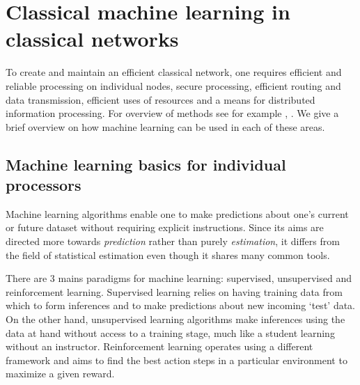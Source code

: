 \documentclass[twocolumn, aps, rmp, amsmath, amssymb, nofootinbib, superscriptaddress, longbibliography, floatfix, table-of-contents, eqsecnum]{revtex4-2}
\begin{document}
\section{Classical machine learning in classical networks}
 To create and maintain an efficient classical network, one requires efficient and reliable processing on individual nodes, secure processing, efficient routing and data transmission, efficient uses of resources and a means for distributed information processing. For overview of methods see for example \cite{boutaba2018comprehensive}, \cite{wang2018machine}.  We give a brief overview on how machine learning can be used in each of these areas. 

\subsection{Machine learning basics for individual processors}
Machine learning algorithms enable one to make predictions about one's current or future dataset without requiring explicit instructions. Since its aims are directed more towards \textit{prediction} rather than purely \textit{estimation}, it differs from the field of statistical estimation even though it shares many common tools.

There are 3 mains paradigms for machine learning: supervised, unsupervised and reinforcement learning. Supervised learning relies on having training data from which to form inferences and to make predictions about new incoming `test' data. On the other hand, unsupervised learning algorithms make inferences using the data at hand without access to a training stage, much like a student learning without an instructor. Reinforcement learning operates using a different framework and aims to find the best action steps in a particular environment to maximize a given reward.
\end{document}
